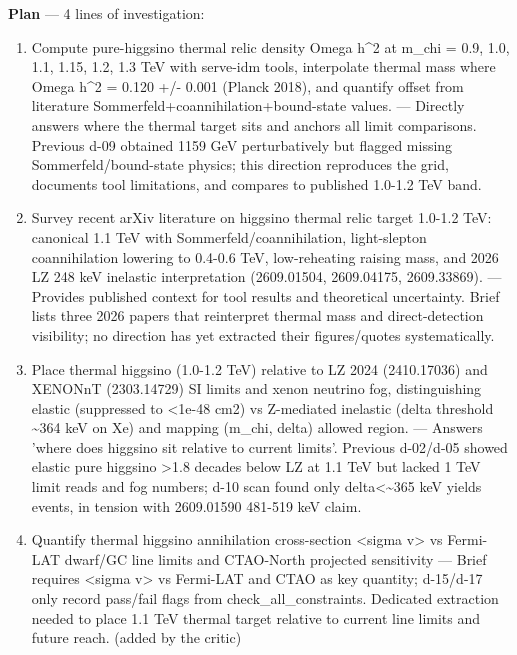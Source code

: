 \documentclass[11pt,a4paper]{article}
\begin{document}
\textbf{Plan} --- 4 lines of investigation:

\begin{enumerate}
  \item Compute pure-higgsino thermal relic density Omega h\textasciicircum{}2 at m\_chi = 0.9, 1.0, 1.1, 1.15, 1.2, 1.3 TeV with serve-idm tools, interpolate thermal mass where Omega h\textasciicircum{}2 = 0.120 +/- 0.001 (Planck 2018), and quantify offset from literature Sommerfeld+coannihilation+bound-state values. --- Directly answers where the thermal target sits and anchors all limit comparisons. Previous d-09 obtained 1159 GeV perturbatively but flagged missing Sommerfeld/bound-state physics; this direction reproduces the grid, documents tool limitations, and compares to published 1.0-1.2 TeV band.
  \item Survey recent arXiv literature on higgsino thermal relic target 1.0-1.2 TeV: canonical 1.1 TeV with Sommerfeld/coannihilation, light-slepton coannihilation lowering to 0.4-0.6 TeV, low-reheating raising mass, and 2026 LZ 248 keV inelastic interpretation (2609.01504, 2609.04175, 2609.33869). --- Provides published context for tool results and theoretical uncertainty. Brief lists three 2026 papers that reinterpret thermal mass and direct-detection visibility; no direction has yet extracted their figures/quotes systematically.
  \item Place thermal higgsino (1.0-1.2 TeV) relative to LZ 2024 (2410.17036) and XENONnT (2303.14729) SI limits and xenon neutrino fog, distinguishing elastic (suppressed to \textless{}1e-48 cm2) vs Z-mediated inelastic (delta threshold \textasciitilde{}364 keV on Xe) and mapping (m\_chi, delta) allowed region. --- Answers 'where does higgsino sit relative to current limits'. Previous d-02/d-05 showed elastic pure higgsino \textgreater{}1.8 decades below LZ at 1.1 TeV but lacked 1 TeV limit reads and fog numbers; d-10 scan found only delta\textless{}\textasciitilde{}365 keV yields events, in tension with 2609.01590 481-519 keV claim.
  \item Quantify thermal higgsino annihilation cross-section \textless{}sigma v\textgreater{} vs Fermi-LAT dwarf/GC line limits and CTAO-North projected sensitivity --- Brief requires \textless{}sigma v\textgreater{} vs Fermi-LAT and CTAO as key quantity; d-15/d-17 only record pass/fail flags from check\_all\_constraints. Dedicated extraction needed to place 1.1 TeV thermal target relative to current line limits and future reach. (added by the critic)

\end{enumerate}
\end{document}
